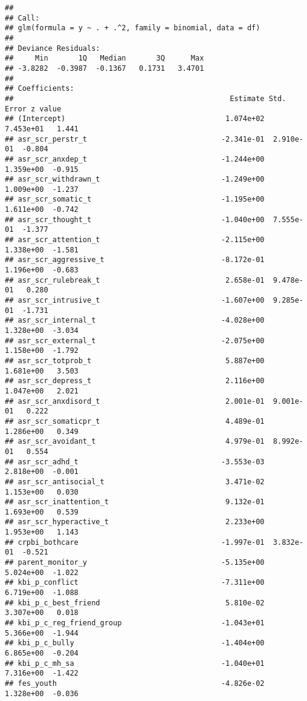 \documentclass[
]{article}
\begin{document}
\begin{verbatim}
## 
## Call:
## glm(formula = y ~ . + .^2, family = binomial, data = df)
## 
## Deviance Residuals: 
##     Min       1Q   Median       3Q      Max  
## -3.8282  -0.3987  -0.1367   0.1731   3.4701  
## 
## Coefficients:
##                                                  Estimate Std. Error z value
## (Intercept)                                     1.074e+02  7.453e+01   1.441
## asr_scr_perstr_t                               -2.341e-01  2.910e-01  -0.804
## asr_scr_anxdep_t                               -1.244e+00  1.359e+00  -0.915
## asr_scr_withdrawn_t                            -1.249e+00  1.009e+00  -1.237
## asr_scr_somatic_t                              -1.195e+00  1.611e+00  -0.742
## asr_scr_thought_t                              -1.040e+00  7.555e-01  -1.377
## asr_scr_attention_t                            -2.115e+00  1.338e+00  -1.581
## asr_scr_aggressive_t                           -8.172e-01  1.196e+00  -0.683
## asr_scr_rulebreak_t                             2.658e-01  9.478e-01   0.280
## asr_scr_intrusive_t                            -1.607e+00  9.285e-01  -1.731
## asr_scr_internal_t                             -4.028e+00  1.328e+00  -3.034
## asr_scr_external_t                             -2.075e+00  1.158e+00  -1.792
## asr_scr_totprob_t                               5.887e+00  1.681e+00   3.503
## asr_scr_depress_t                               2.116e+00  1.047e+00   2.021
## asr_scr_anxdisord_t                             2.001e-01  9.001e-01   0.222
## asr_scr_somaticpr_t                             4.489e-01  1.286e+00   0.349
## asr_scr_avoidant_t                              4.979e-01  8.992e-01   0.554
## asr_scr_adhd_t                                 -3.553e-03  2.818e+00  -0.001
## asr_scr_antisocial_t                            3.471e-02  1.153e+00   0.030
## asr_scr_inattention_t                           9.132e-01  1.693e+00   0.539
## asr_scr_hyperactive_t                           2.233e+00  1.953e+00   1.143
## crpbi_bothcare                                 -1.997e-01  3.832e-01  -0.521
## parent_monitor_y                               -5.135e+00  5.024e+00  -1.022
## kbi_p_conflict                                 -7.311e+00  6.719e+00  -1.088
## kbi_p_c_best_friend                             5.810e-02  3.307e+00   0.018
## kbi_p_c_reg_friend_group                       -1.043e+01  5.366e+00  -1.944
## kbi_p_c_bully                                  -1.404e+00  6.865e+00  -0.204
## kbi_p_c_mh_sa                                  -1.040e+01  7.316e+00  -1.422
## fes_youth                                      -4.826e-02  1.328e+00  -0.036

\end{verbatim}
\end{document}
